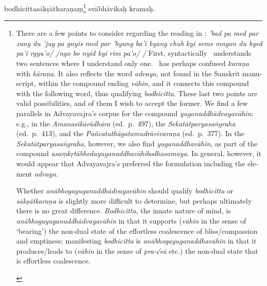\documentclass[naipra.tex]{subfiles}
\begin{document}
\begin{sanskrit}


\pstart
{} bodhicittasākṣātkaraṇaṃ\footnote{
	\begin{english}%
		There are a few points to consider regarding the reading in \TIB : \emph{'bad pa med par zung du 'jug pa gnyis med par 'byung ba'i byang chub kyi sems mngon du byed pa'i rgyu'o/ /ngo bo nyid kyi rim pa'o/ /}
		First, syntactically \TIB\ understands two sentences where I understand only one. 
		\TIB\ has perhaps confused \emph{karaṇa} with \emph{kāraṇa}.
		It also reflects the word \emph{advaya}, not found in the Sanskrit manuscript, within the compound ending \emph{vāhin}, and it connects this compound with the following word, thus qualifying \emph{bodhicitta}.
		These last two points are valid possibilities, and of them I wish to accept the former.
		We find a few parallels in Advayavajra's corpus for the compound \emph{yuganaddhādvayavāhin}: e.g., in the \emph{Amanasikārādhāra} (ed.\ p.\ 497), the \emph{Sekatātparyasaṅgraha} (ed.\ p.\ 413), and the \emph{Pañcatathāgatamudrāvivaraṇa} (ed.\ p.\ 377). 
		In the \emph{Sekatātparyasaṅgraha}, however, we also find \emph{yuganaddhavāhin}, as part of the compound \emph{asaṃkṛtābhedayuganaddhavāhibodhasamaya}.
		In general, however, it would appear that Advayavajra's preferred the formulation including the element \emph{advaya}.

		Whether \emph{anābhogayuganaddhādvayavāhin} should qualify \emph{bodhicitta} or \emph{sākṣātkaraṇa} is slightly more difficult to determine, but perhaps ultimately there is no great difference.
		\emph{Bodhicitta}, the innate nature of mind, is \emph{anābhogayuganaddhādvayavāhin} in that it supports (\emph{vāhin} in the sense of `bearing') the non-dual state of the effortless coalescence of bliss/compassion and emptiness; manifesting \emph{bodhicitta} is \emph{anābhogayuganaddhavāhin} in that it produces/leads to (\emph{vāhin} in the sense of \emph{pra-√sū} etc.) the non-dual state that is effortless coalescence.%
	\end{english}
} svābhāvikaḥ kramaḥ. 
\pend


\end{sanskrit}
\end{document}
